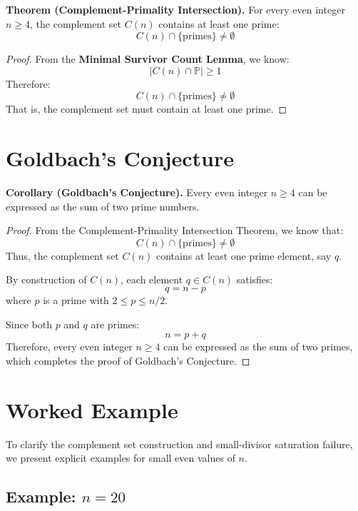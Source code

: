\documentclass[11pt]{article}
\begin{document}
	\textbf{Theorem (Complement-Primality Intersection).}  
	For every even integer \( n \geq 4 \), the complement set \( C(n) \) contains at least one prime:
	\[
	C(n) \cap \{\text{primes}\} \neq \emptyset
	\]
	
	\begin{proof}
		From the \textbf{Minimal Survivor Count Lemma}, we know:
		\[
		|C(n) \cap \mathbb{P}| \geq 1
		\]
		Therefore:
		\[
		C(n) \cap \{\text{primes}\} \neq \emptyset
		\]
		That is, the complement set must contain at least one prime.
	\end{proof}
	



	
	\section{Goldbach's Conjecture}
	
	\textbf{Corollary (Goldbach’s Conjecture).}  
	Every even integer \( n \geq 4 \) can be expressed as the sum of two prime numbers.
	
	\begin{proof}
		From the Complement-Primality Intersection Theorem, we know that:
		\[
		C(n) \cap \{\text{primes}\} \neq \emptyset
		\]
		Thus, the complement set \( C(n) \) contains at least one prime element, say \( q \).
		
		By construction of \( C(n) \), each element \( q \in C(n) \) satisfies:
		\[
		q = n - p
		\]
		where \( p \) is a prime with \( 2 \leq p \leq n/2 \).
		
		Since both \( p \) and \( q \) are primes:
		\[
		n = p + q
		\]
		Therefore, every even integer \( n \geq 4 \) can be expressed as the sum of two primes, which completes the proof of Goldbach’s Conjecture.
	\end{proof}

	
	
	\section{Worked Example}
	
	To clarify the complement set construction and small-divisor saturation failure, we present explicit examples for small even values of \( n \).
	
	\subsection*{Example: \( n = 20 \)}
	
\end{document}
